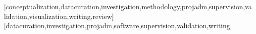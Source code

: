 \documentclass[portuguese]{textolivre}
\begin{document}
\printbibliography\label{sec-bib}
\begin{contributors}
[conceptualization,datacuration,investigation,methodology,projadm,supervision,validation,visualization,writing,review]
[datacuration,investigation,projadm,software,supervision,validation,writing]
\end{contributors}
\end{document}
